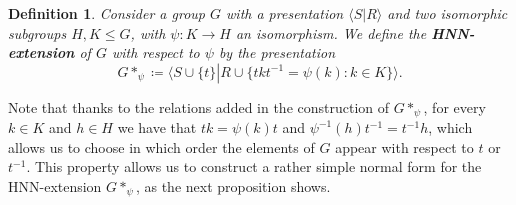 \documentclass[letterpaper,10pt]{article}
\theoremstyle{plain}
\newtheorem{definition}{Definition}[section]
\newtheorem*{example*}{Example}
\begin{document}
\begin{definition}\label{definition.hnn_extension} Consider a group $G$ with a presentation $\langle S\left|\right.R\rangle$ and two isomorphic subgroups $H,K\le G$, with $\psi:K\to H$ an isomorphism. We define the \textbf{HNN-extension} of $G$ with respect to $\psi$ by the presentation
	$$
	G*_{\psi}\coloneqq \langle S\cup\{t\} \left|\right. R\cup \{t k t^{-1}=\psi(k): k\in K \} \rangle.
	$$
\end{definition}



Note that thanks to the relations added in the construction of $G*_{\psi}$, for every $k\in K$ and $h\in H$ we have that $tk=\psi(k)t$ and $\psi^{-1}(h)t^{-1}=t^{-1}h$, which allows us to choose in which order the elements of $G$ appear with respect to $t$ or $t^{-1}$. This property allows us to construct a rather simple normal form for the HNN-extension $G*_{\psi}$, as the next proposition shows.
\end{document}
